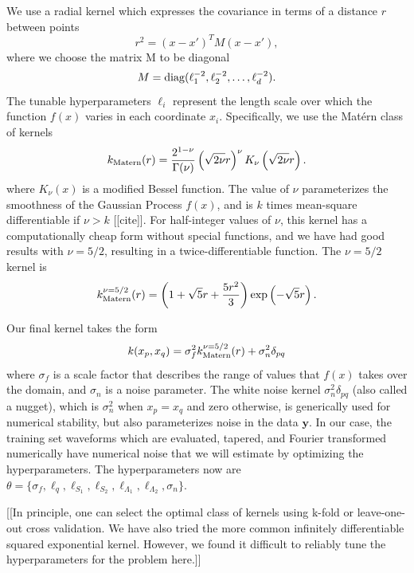 \documentclass[prd,aps,letter,twocolumn,floatfix,notitlepage]{revtex4-1}
\begin{document}
We use a radial kernel which expresses the covariance in terms of a distance $r$ between points
\begin{equation}
r^2 = (x-x')^T M (x-x'),
\end{equation}
where we choose the matrix M to be diagonal
\begin{equation}
M = {\rm diag}(\ell_1^{-2}, \ell_2^{-2}, \dots, \ell_d^{-2}).
\end{equation}
The tunable hyperparameters $\ell_i$ represent the length scale over which the function $f(x)$ varies in 
each coordinate $x_i$. Specifically, we use the Mat\'{e}rn class of kernels
\begin{equation}
k_{\rm Matern}(r) = \frac{2^{1-\nu}}{\Gamma(\nu)} \left(\sqrt{2\nu} r\right)^\nu K_\nu \left(\sqrt{2\nu} r \right).
\end{equation}
where $K_\nu(x)$ is a modified Bessel function. The value of $\nu$ parameterizes the smoothness of the 
Gaussian Process $f(x)$, and is $k$ times mean-square differentiable if $\nu>k$ [[cite]]. For half-integer values of $\nu$, this 
kernel has a computationally cheap form without special functions, and we have had good results with $\nu=5/2$, 
resulting in a twice-differentiable function. The $\nu=5/2$ kernel is
\begin{equation}
k_{\rm Matern}^{\nu=5/2}(r) = \left(1+\sqrt{5}r + \frac{5r^2}{3}\right) \exp\left(-\sqrt{5}r\right).
\end{equation}

Our final kernel takes the form
\begin{equation}
k(x_p, x_q) = \sigma_f^2 k_{\rm Matern}^{\nu=5/2}(r) + \sigma_n^2 \delta_{pq}
\end{equation}
where $\sigma_f$ is a scale factor that describes the range of values that $f(x)$ takes over the domain, 
and $\sigma_n$ is a noise parameter. The white noise kernel $\sigma_n^2 \delta_{pq}$ (also called a nugget), which is
$\sigma_n^2$ when $x_p=x_q$ and zero otherwise, is generically used for numerical stability, but also parameterizes
noise in the data ${\bm y}$. In our case, the training set waveforms which are evaluated, tapered, and 
Fourier transformed numerically have numerical noise that we will estimate by optimizing the hyperparameters.
The hyperparameters now are $\theta = \{\sigma_f, \ell_q, \ell_{S_1}, \ell_{S_2}, \ell_{\Lambda_1}, \ell_{\Lambda_2}, \sigma_n\}$.

[[In principle, one can select the optimal class of kernels using k-fold or leave-one-out cross validation. We have also tried the 
more common infinitely differentiable squared exponential kernel. However, we found it difficult to reliably tune the 
hyperparameters for the problem here.]]
\end{document}
